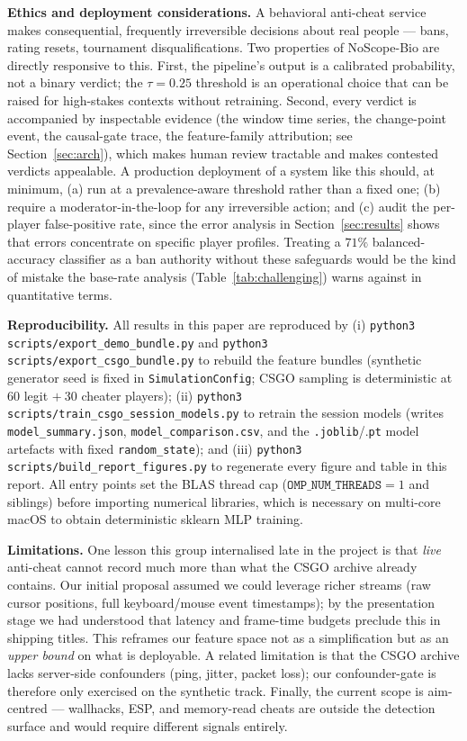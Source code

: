 \documentclass[conference,10pt]{IEEEtran}
\begin{document}
\textbf{Ethics and deployment considerations.} A behavioral anti-cheat
service makes consequential, frequently irreversible decisions about
real people --- bans, rating resets, tournament disqualifications. Two
properties of NoScope-Bio are directly responsive to this. First, the
pipeline's output is a calibrated probability, not a binary verdict;
the $\tau = 0.25$ threshold is an operational choice that can be
raised for high-stakes contexts without retraining. Second, every
verdict is accompanied by inspectable evidence (the window time
series, the change-point event, the causal-gate trace, the
feature-family attribution; see Section~\ref{sec:arch}), which makes
human review tractable and makes contested verdicts appealable. A
production deployment of a system like this should, at minimum, (a)
run at a prevalence-aware threshold rather than a fixed one; (b)
require a moderator-in-the-loop for any irreversible action; and (c)
audit the per-player false-positive rate, since the error analysis in
Section~\ref{sec:results} shows that errors concentrate on specific
player profiles. Treating a $71\%$ balanced-accuracy classifier as a
ban authority without these safeguards would be the kind of mistake
the base-rate analysis (Table~\ref{tab:challenging}) warns against in
quantitative terms.

\textbf{Reproducibility.} All results in this paper are reproduced by
(i) \texttt{python3 scripts/export\_demo\_bundle.py} and
\texttt{python3 scripts/export\_csgo\_bundle.py} to rebuild the feature
bundles (synthetic generator seed is fixed in
\texttt{SimulationConfig}; CSGO sampling is deterministic at $60$ legit
$+\ 30$ cheater players); (ii) \texttt{python3
scripts/train\_csgo\_session\_models.py} to retrain the session models
(writes \texttt{model\_summary.json},
\texttt{model\_comparison.csv}, and the \texttt{.joblib}/.\texttt{pt}
model artefacts with fixed \texttt{random\_state}); and (iii)
\texttt{python3 scripts/build\_report\_figures.py} to regenerate every
figure and table in this report. All entry points set the BLAS thread
cap ($\mathtt{OMP\_NUM\_THREADS}{=}1$ and siblings) before importing
numerical libraries, which is necessary on multi-core macOS to obtain
deterministic sklearn MLP training.

\textbf{Limitations.} One lesson this group internalised
late in the project is that \emph{live} anti-cheat cannot record much
more than what the CSGO archive already contains. Our initial proposal
assumed we could leverage richer streams (raw cursor positions, full
keyboard/mouse event timestamps); by the presentation stage we had
understood that latency and frame-time budgets preclude this in
shipping titles. This reframes our feature space not as a simplification
but as an \emph{upper bound} on what is deployable. A related limitation
is that the CSGO archive lacks server-side confounders (ping, jitter,
packet loss); our confounder-gate is therefore only exercised on the
synthetic track. Finally, the current scope is aim-centred --- wallhacks,
ESP, and memory-read cheats are outside the detection surface and would
require different signals entirely.
\end{document}
